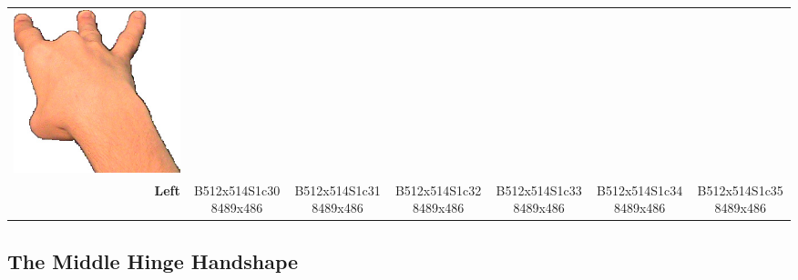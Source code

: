 \documentclass{article}
\begin{document}
\begin{center}
\begin{tabular}{r*{6}{c}}
\includegraphics[scale=0.1]{images/08-02-6.jpg}\\
\textbf{Left}&
B512x514S1c308489x486&
B512x514S1c318489x486&
B512x514S1c328489x486&
B512x514S1c338489x486&
B512x514S1c348489x486&
B512x514S1c358489x486\\
\end{tabular}
\end{center}

\subsection{The Middle Hinge Handshape}
\end{document}
